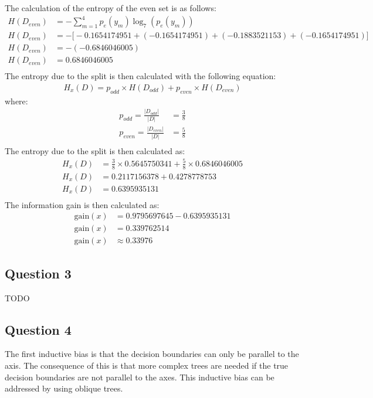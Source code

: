 \documentclass[10pt]{article}
\begin{document}
The calculation of the entropy of the even set is as follows:
\begin{align*}
    H(D_{even}) &= - \sum_{m=1}^{4} p_{e}(y_m) \log_7 \left( p_{e}(y_m) \right) \\
    H(D_{even}) &= - \big[ -0.1654174951 + (-0.1654174951) + (-0.1883521153) + (-0.1654174951)\big] \\
    H(D_{even}) &= - (-0.6846046005) \\
    H(D_{even}) &= 0.6846046005 \\
\end{align*}
The entropy due to the split is then calculated with the following equation:
\begin{align*}
    H_x(D) = p_{odd} \times H(D_{odd}) + p_{even} \times H(D_{even})
\end{align*}
where:
\begin{align*}
    p_{odd} = \frac{|D_{odd}|}{|D|} &= \frac{3}{8}\\
    p_{even} = \frac{|D_{even}|}{|D|} &= \frac{5}{8}\\
\end{align*}
The entropy due to the split is then calculated as:
\begin{align*}
    H_x(D) &= \frac{3}{8} \times 0.5645750341 + \frac{5}{8} \times 0.6846046005 \\
    H_x(D) &= 0.2117156378 + 0.4278778753 \\
    H_x(D) &= 0.6395935131 \\
\end{align*}
The information gain is then calculated as:
\begin{align*}
    \text{gain}(x) &= 0.9795697645 - 0.6395935131 \\
    \text{gain}(x) &= 0.339762514 \\
    \text{gain}(x) &\approx 0.33976
\end{align*}

\subsection*{Question 3}

TODO

\subsection*{Question 4}

The first inductive bias is that the decision boundaries can only be parallel to the axis. The
consequence of this is that more complex trees are needed if the true decision boundaries are not
parallel to the axes. This inductive bias can be addressed by using oblique trees.
\end{document}
